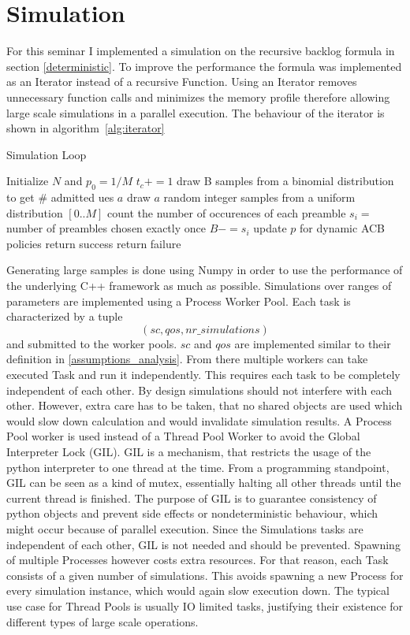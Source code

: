 \documentclass[conference]{IEEEtran}
\begin{document}
\section{Simulation}
For this seminar I implemented a simulation on the recursive backlog formula in section \ref{deterministic}.
To improve the performance the formula was implemented as an Iterator instead of a recursive Function.
Using an Iterator removes unnecessary function calls and minimizes the memory profile therefore allowing large scale simulations in a parallel execution.
The behaviour of the iterator is shown in algorithm~\ref{alg:iterator}
\begin{algorithm}
    \caption{Simulation Loop}\label{alg:iterator}
\begin{algorithmic}[1]
    \State Initialize $N$ and $p_0=1/M$
    \State $t_c+=1$
    \State draw B samples from a binomial distribution to get # admitted ues $a$
    \State draw $a$ random integer samples from a uniform distribution $[0.. M]$
    \State count the number of occurences of each preamble
    \State $s_i= $ number of preambles chosen exactly once
    \State $B -= s_i$
    \State update $p$ for dynamic ACB policies
    \EndWhile
    \State return success
    \Else
    \State return failure
    \EndIf
\end{algorithmic}
\end{algorithm}
Generating large samples is done using Numpy in order to use the performance of the underlying C++ framework as much as possible.
Simulations over ranges of parameters are implemented using a Process Worker Pool.
Each task is characterized by a tuple \[(sc, qos, nr\_simulations)\] and submitted to the worker pools.
$sc$ and $qos$ are implemented similar to their definition in \ref{assumptions_analysis}.
From there multiple workers can take executed Task and run it independently.
This requires each task to be completely independent of each other.
By design simulations should not interfere with each other.
However, extra care has to be taken, that no shared objects are used which would slow down calculation and would invalidate simulation results.
A Process Pool worker is used instead of a Thread Pool Worker to avoid the Global Interpreter Lock (GIL).
GIL is a mechanism, that restricts the usage of the python interpreter to one thread at the time.
From a programming standpoint, GIL can be seen as a kind of mutex, essentially halting all other threads until the current thread is finished.
The purpose of GIL is to guarantee consistency of python objects and prevent side effects or nondeterministic behaviour, which might occur because of parallel execution.
Since the Simulations tasks are independent of each other, GIL is not needed and should be prevented.
Spawning of multiple Processes however costs extra resources.
For that reason, each Task consists of a given number of simulations.
This avoids spawning a new Process for every simulation instance, which would again slow execution down.
The typical use case for Thread Pools is usually IO limited tasks, justifying their existence for different types of large scale operations.
\end{document}
